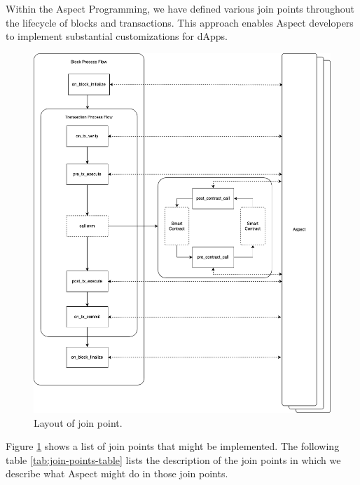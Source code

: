 Within the Aspect Programming, we have defined various join points throughout the lifecycle of blocks and transactions. This approach enables Aspect developers to implement substantial customizations for dApps.

\begin{figure}[ht]
  \centering
  \includegraphics[width=0.4\linewidth]{sections/join-point-layout.png}
  \caption{Layout of join point.}
  \label{fig:join_point_layout}
\end{figure}

Figure \ref{fig:join_point_layout}  shows a list of join points that might be implemented. The following table \ref{tab:join-points-table} lists the description of the join points in which we describe what Aspect might do in those join points. 

